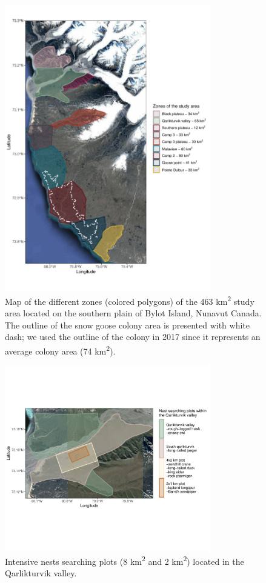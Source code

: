 \documentclass[a4paper,twoside,12pt]{article}
\begin{document}
\begin{figure}
\centering
  \includegraphics[width=0.8\textwidth, angle=0]{figures/zones_study_area.pdf}
   \caption{Map of the different zones (colored polygons) of the 463 km\textsuperscript{2} study area located on the southern plain of Bylot Island, Nunavut Canada. The outline of the snow goose colony area is presented with white dash; we used the outline of the colony in 2017 since it represents an average colony area (74 km\textsuperscript{2}).}
  \label{figure:zones}
\end{figure}

\begin{figure}
\centering
  \includegraphics[width=0.8\textwidth, angle=0]{figures/qarlikturvik_valley.pdf}
  \vspace{-70pt} %
  \caption{Intensive nests searching plots (8 km\textsuperscript{2} and 2 km\textsuperscript{2}) located in the Qarlikturvik valley.}
 \label{figure:qarlikturvik_valley}
\end{figure}
\newpage
\end{document}

